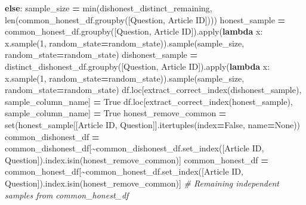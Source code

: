 \documentclass[
]{article}
\newenvironment{Shaded}{\begin{snugshade}}{\end{snugshade}}
\newcommand{\BuiltInTok}[1]{#1}
\newcommand{\CommentTok}[1]{\textcolor[rgb]{0.56,0.35,0.01}{\textit{#1}}}
\newcommand{\ControlFlowTok}[1]{\textcolor[rgb]{0.13,0.29,0.53}{\textbf{#1}}}
\newcommand{\DecValTok}[1]{\textcolor[rgb]{0.00,0.00,0.81}{#1}}
\newcommand{\KeywordTok}[1]{\textcolor[rgb]{0.13,0.29,0.53}{\textbf{#1}}}
\newcommand{\NormalTok}[1]{#1}
\newcommand{\OperatorTok}[1]{\textcolor[rgb]{0.81,0.36,0.00}{\textbf{#1}}}
\newcommand{\StringTok}[1]{\textcolor[rgb]{0.31,0.60,0.02}{#1}}
\newcommand{\VariableTok}[1]{\textcolor[rgb]{0.00,0.00,0.00}{#1}}
\begin{document}
\begin{Shaded}
\begin{Highlighting}[]
    \ControlFlowTok{else}\NormalTok{:}
\NormalTok{        sample\_size }\OperatorTok{=} \BuiltInTok{min}\NormalTok{(dishonest\_distinct\_remaining, }\BuiltInTok{len}\NormalTok{(common\_honest\_df.groupby([}\StringTok{\textquotesingle{}Question\textquotesingle{}}\NormalTok{, }\StringTok{\textquotesingle{}Article ID\textquotesingle{}}\NormalTok{])))}
\NormalTok{        honest\_sample }\OperatorTok{=}\NormalTok{ common\_honest\_df.groupby([}\StringTok{\textquotesingle{}Question\textquotesingle{}}\NormalTok{, }\StringTok{\textquotesingle{}Article ID\textquotesingle{}}\NormalTok{]).}\BuiltInTok{apply}\NormalTok{(}\KeywordTok{lambda}\NormalTok{ x: x.sample(}\DecValTok{1}\NormalTok{, random\_state}\OperatorTok{=}\NormalTok{random\_state)).sample(sample\_size, random\_state}\OperatorTok{=}\NormalTok{random\_state)}
\NormalTok{        dishonest\_sample }\OperatorTok{=}\NormalTok{ distinct\_dishonest\_df.groupby([}\StringTok{\textquotesingle{}Question\textquotesingle{}}\NormalTok{, }\StringTok{\textquotesingle{}Article ID\textquotesingle{}}\NormalTok{]).}\BuiltInTok{apply}\NormalTok{(}\KeywordTok{lambda}\NormalTok{ x: x.sample(}\DecValTok{1}\NormalTok{, random\_state}\OperatorTok{=}\NormalTok{random\_state)).sample(sample\_size, random\_state}\OperatorTok{=}\NormalTok{random\_state)}
\NormalTok{        df.loc[extract\_correct\_index(dishonest\_sample), sample\_column\_name] }\OperatorTok{=} \VariableTok{True}
\NormalTok{        df.loc[extract\_correct\_index(honest\_sample), sample\_column\_name] }\OperatorTok{=} \VariableTok{True}
\NormalTok{        honest\_remove\_common }\OperatorTok{=} \BuiltInTok{set}\NormalTok{(honest\_sample[[}\StringTok{\textquotesingle{}Article ID\textquotesingle{}}\NormalTok{, }\StringTok{\textquotesingle{}Question\textquotesingle{}}\NormalTok{]].itertuples(index}\OperatorTok{=}\VariableTok{False}\NormalTok{, name}\OperatorTok{=}\VariableTok{None}\NormalTok{))}
\NormalTok{        common\_dishonest\_df }\OperatorTok{=}\NormalTok{ common\_dishonest\_df[}\OperatorTok{\textasciitilde{}}\NormalTok{common\_dishonest\_df.set\_index([}\StringTok{\textquotesingle{}Article ID\textquotesingle{}}\NormalTok{, }\StringTok{\textquotesingle{}Question\textquotesingle{}}\NormalTok{]).index.isin(honest\_remove\_common)]}
\NormalTok{        common\_honest\_df }\OperatorTok{=}\NormalTok{ common\_honest\_df[}\OperatorTok{\textasciitilde{}}\NormalTok{common\_honest\_df.set\_index([}\StringTok{\textquotesingle{}Article ID\textquotesingle{}}\NormalTok{, }\StringTok{\textquotesingle{}Question\textquotesingle{}}\NormalTok{]).index.isin(honest\_remove\_common)]}
    \CommentTok{\# Remaining independent samples from common\_honest\_df}

\end{Highlighting}
\end{Shaded}
\end{document}
